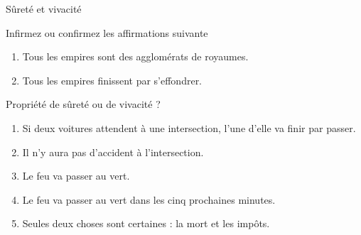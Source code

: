 
\begingroup

\begin{frame}{Sûreté et vivacité}
  \begin{alertblock}{Infirmez ou confirmez les affirmations suivante}
    \begin{enumerate}
    \item Tous les empires sont des agglomérats de royaumes.
    \item Tous les empires finissent par s'effondrer.
    \end{enumerate}
  \end{alertblock}
  \begin{alertblock}{Propriété de sûreté ou de vivacité ?}
    \begin{enumerate}
    \item Si deux voitures attendent à une intersection, l'une d'elle va finir par passer.
    \item Il n'y aura pas d'accident à l'intersection.
    \item Le feu va passer au vert.
    \item Le feu va passer au vert dans les cinq prochaines minutes.
    \item Seules deux choses sont certaines : la mort et les impôts.
    \end{enumerate}
  \end{alertblock}
\end{frame}

\endgroup
\endinput
